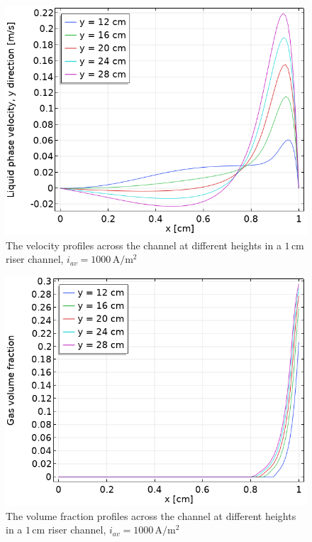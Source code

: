  \begin{figure}[H]
     \centering
     \includegraphics[scale = 0.7]{velocityprofile1cm1000A.png}
     \caption{The velocity profiles across the channel at different heights in a $1 \, \mathrm{cm}$ riser channel, $i_{av} = 1000 \, \mathrm{A/m^2}$}
     \label{velocityprofilecirculating}
 \end{figure}
 
 
 \begin{figure}[H]
     \centering
     \includegraphics[scale = 0.7]{volumefraction1cm1000A.png}
     \caption{The volume fraction profiles across the channel at different heights in a $1 \, \mathrm{cm}$ riser channel, $i_{av} = 1000 \, \mathrm{A/m^2}$}
     \label{volumefractionprofilecirculating}
 \end{figure}
 
